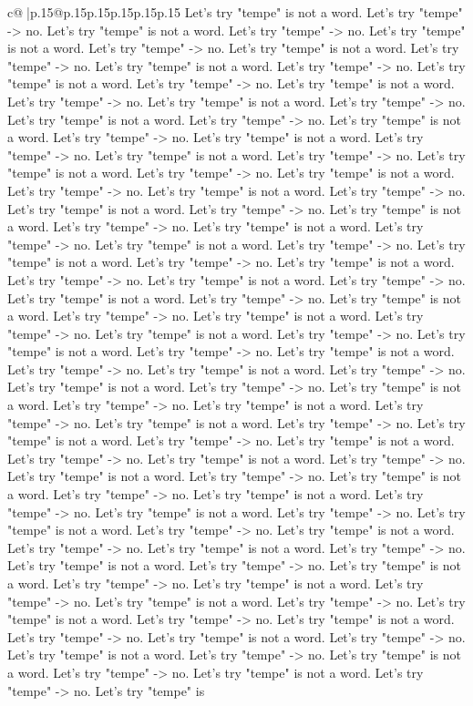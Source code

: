 \documentclass{article}
\begin{document}
{\begin{supertabular}{c@{$\;$}|p{.15\linewidth}@{}p{.15\linewidth}p{.15\linewidth}p{.15\linewidth}p{.15\linewidth}p{.15\linewidth}}
{{{Let's try "tempe" is not a word. Let's try "tempe" {-}> no. Let's try "tempe" is not a word. Let's try "tempe" {-}> no. Let's try "tempe" is not a word. Let's try "tempe" {-}> no. Let's try "tempe" is not a word. Let's try "tempe" {-}> no. Let's try "tempe" is not a word. Let's try "tempe" {-}> no. Let's try "tempe" is not a word. Let's try "tempe" {-}> no. Let's try "tempe" is not a word. Let's try "tempe" {-}> no. Let's try "tempe" is not a word. Let's try "tempe" {-}> no. Let's try "tempe" is not a word. Let's try "tempe" {-}> no. Let's try "tempe" is not a word. Let's try "tempe" {-}> no. Let's try "tempe" is not a word. Let's try "tempe" {-}> no. Let's try "tempe" is not a word. Let's try "tempe" {-}> no. Let's try "tempe" is not a word. Let's try "tempe" {-}> no. Let's try "tempe" is not a word. Let's try "tempe" {-}> no. Let's try "tempe" is not a word. Let's try "tempe" {-}> no. Let's try "tempe" is not a word. Let's try "tempe" {-}> no. Let's try "tempe" is not a word. Let's try "tempe" {-}> no. Let's try "tempe" is not a word. Let's try "tempe" {-}> no. Let's try "tempe" is not a word. Let's try "tempe" {-}> no. Let's try "tempe" is not a word. Let's try "tempe" {-}> no. Let's try "tempe" is not a word. Let's try "tempe" {-}> no. Let's try "tempe" is not a word. Let's try "tempe" {-}> no. Let's try "tempe" is not a word. Let's try "tempe" {-}> no. Let's try "tempe" is not a word. Let's try "tempe" {-}> no. Let's try "tempe" is not a word. Let's try "tempe" {-}> no. Let's try "tempe" is not a word. Let's try "tempe" {-}> no. Let's try "tempe" is not a word. Let's try "tempe" {-}> no. Let's try "tempe" is not a word. Let's try "tempe" {-}> no. Let's try "tempe" is not a word. Let's try "tempe" {-}> no. Let's try "tempe" is not a word. Let's try "tempe" {-}> no. Let's try "tempe" is not a word. Let's try "tempe" {-}> no. Let's try "tempe" is not a word. Let's try "tempe" {-}> no. Let's try "tempe" is not a word. Let's try "tempe" {-}> no. Let's try "tempe" is not a word. Let's try "tempe" {-}> no. Let's try "tempe" is not a word. Let's try "tempe" {-}> no. Let's try "tempe" is not a word. Let's try "tempe" {-}> no. Let's try "tempe" is not a word. Let's try "tempe" {-}> no. Let's try "tempe" is not a word. Let's try "tempe" {-}> no. Let's try "tempe" is not a word. Let's try "tempe" {-}> no. Let's try "tempe" is not a word. Let's try "tempe" {-}> no. Let's try "tempe" is not a word. Let's try "tempe" {-}> no. Let's try "tempe" is not a word. Let's try "tempe" {-}> no. Let's try "tempe" is not a word. Let's try "tempe" {-}> no. Let's try "tempe" is not a word. Let's try "tempe" {-}> no. Let's try "tempe" is not a word. Let's try "tempe" {-}> no. Let's try "tempe" is not a word. Let's try "tempe" {-}> no. Let's try "tempe" is not a word. Let's try "tempe" {-}> no. Let's try "tempe" is not a word. Let's try "tempe" {-}> no. Let's try "tempe" is not a word. Let's try "tempe" {-}> no. Let's try "tempe" is not a word. Let's try "tempe" {-}> no. Let's try "tempe" is not a word. Let's try "tempe" {-}> no. Let's try "tempe" is not a word. Let's try "tempe" {-}> no. Let's try "tempe" is not a word. Let's try "tempe" {-}> no. Let's try "tempe" is }}}
\end{supertabular}}
\end{document}
